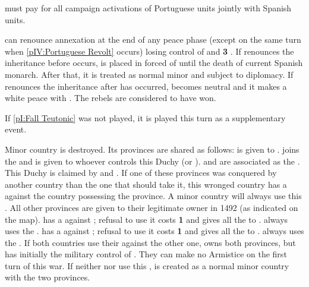\phmil
\aparag \SPA must pay for all campaign activations of Portuguese units jointly
with Spanish units.

\phpaix
\aparag \SPA can renounce annexation at the end of any peace phase (except on
the same turn when \ref{pIV:Portuguese Revolt} occurs) losing control of
\paysPortugal and {\bf 3} \STAB.
\bparag If \SPA renounces the inheritance before  occurs, \paysPortugal is placed in forced \EG of \SPA until the
death of current Spanish monarch. After that, it is treated as normal minor
and subject to diplomacy.
\bparag If \SPA renounces the inheritance after  has occurred, \paysPortugal becomes neutral and it makes a white
peace with \SPA.  The rebels are considered to have won.





\condition{}
\aparag If \ref{pI:Fall Teutonic} was not played, it is played this turn as a
supplementary event.

\phevnt
\aparag Minor country  is destroyed.  Its provinces are
shared as follows:
\bparag \provinceEstland is given to \SUEsue.
\bparag \provinceMemel joins the  and is given to
whoever controls this Duchy (\POLpol or \paysBrandebourg).
\bparag \provinceLivonija and \provinceKurland are associated as the
. This Duchy is claimed by \SUEsue and \POLpol.
\bparag If one of these provinces was conquered by another country than the
one that should take it, this wronged country has a \CB against the country
possessing the province. A minor country will always use this \CB.
\bparag All other provinces are given to their legitimate owner in 1492 (as
indicated on the map).
\bparag \POLpol has a \CB against \SUEsue; refusal to use it costs {\bf 1
  \STAB} and gives all the  to \SUEsue. \POLmin
always uses the \CB.
\bparag \SUEsue has a \CB against \POL; refusal to use it costs {\bf 1 \STAB}
and gives all the  to \POL. \SUEMin always uses the
\CB.
\bparag If both countries use their \CB against the other one, \POLpol owns
both provinces, but \SUE has initially the military control of
\provinceLivonija.  They can make no Armistice on the first turn of this war.
\bparag If neither \SUE nor \POL use this \CB, \payscourlande is created as a
normal minor country with the two provinces.


